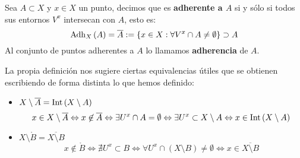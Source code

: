 \begin{defi}[Adherencia]
Sea $A \subset X$ y $x\in X$ un punto, decimos que es \textbf{adherente a $A$} si y sólo si todos sus entornos $V^x$ intersecan con $A$, esto es:
$$
\operatorname{Adh}_X\left( A \right) = \overline{A} := \{x \in X: \forall V^x \cap A \neq \emptyset\} \supset A
$$
Al conjunto de puntos adherentes a $A$ lo llamamos \textbf{adherencia} de $A$.
\end{defi}

\begin{obs}
La propia definición nos sugiere ciertas equivalencias útiles que se obtienen escribiendo de forma distinta lo que hemos definido:
\begin{itemize}
\item $X \setminus \overline{A} = \operatorname{Int}\left( X \setminus A \right)$
$$
x \in X \setminus \overline{A} \Leftrightarrow x \not\in \overline{A} \Leftrightarrow \exists U^x \cap A = \emptyset \Leftrightarrow \exists U^x \subset X \setminus A \Leftrightarrow x \in \operatorname{Int}\left( X \setminus A \right)
$$
\item $X \setminus \mathring{B} = \overline{X \setminus B}$
$$
x \not\in \mathring{B} \Leftrightarrow \nexists U^x \subset B \Leftrightarrow \forall U^x \cap \left( X \setminus B \right) \neq \emptyset \Leftrightarrow x \in \overline{X \setminus B}
$$
\end{itemize}
\end{obs}

